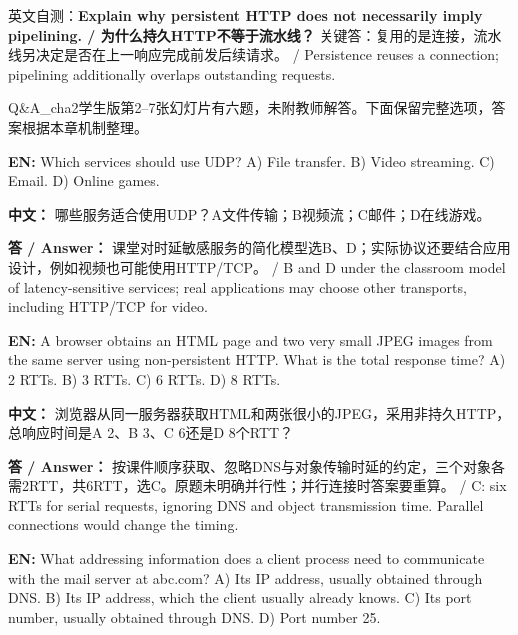 英文自测：\textbf{Explain why persistent HTTP does not necessarily imply pipelining. / 为什么持久HTTP不等于流水线？} 关键答：复用的是连接，流水线另决定是否在上一响应完成前发后续请求。 / Persistence reuses a connection; pipelining additionally overlaps outstanding requests.








Q\&A\_cha2学生版第2–7张幻灯片有六题，未附教师解答。下面保留完整选项，答案根据本章机制整理。





\textbf{EN:} Which services should use UDP? A) File transfer. B) Video streaming. C) Email. D) Online games.


\textbf{中文：} 哪些服务适合使用UDP？A文件传输；B视频流；C邮件；D在线游戏。


\textbf{答 / Answer：} 课堂对时延敏感服务的简化模型选B、D；实际协议还要结合应用设计，例如视频也可能使用HTTP/TCP。 / B and D under the classroom model of latency-sensitive services; real applications may choose other transports, including HTTP/TCP for video.





\textbf{EN:} A browser obtains an HTML page and two very small JPEG images from the same server using non-persistent HTTP. What is the total response time? A) 2 RTTs. B) 3 RTTs. C) 6 RTTs. D) 8 RTTs.


\textbf{中文：} 浏览器从同一服务器获取HTML和两张很小的JPEG，采用非持久HTTP，总响应时间是A 2、B 3、C 6还是D 8个RTT？


\textbf{答 / Answer：} 按课件顺序获取、忽略DNS与对象传输时延的约定，三个对象各需2RTT，共6RTT，选C。原题未明确并行性；并行连接时答案要重算。 / C: six RTTs for serial requests, ignoring DNS and object transmission time. Parallel connections would change the timing.





\textbf{EN:} What addressing information does a client process need to communicate with the mail server at abc.com? A) Its IP address, usually obtained through DNS. B) Its IP address, which the client usually already knows. C) Its port number, usually obtained through DNS. D) Port number 25.


